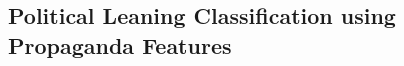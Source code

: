 












\subsection{\statusgreen Political Leaning Classification using Propaganda Features}
\label{ssec:ps_prop_leaning_classifier}

